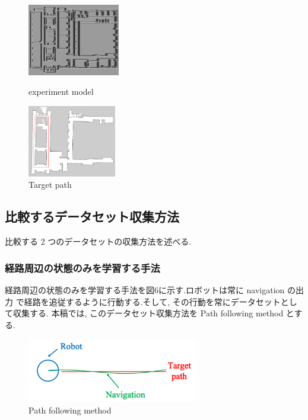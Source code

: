 \documentclass{jarticle}
\begin{document}
\begin{figure}[htbp]
  \begin{minipage}{0.5\hsize}
   \centering
   \includegraphics[width=40.1mm]{figs/gazebo.png}
   \caption{experiment model}
  \end{minipage}
  \begin{minipage}{0.5\hsize}
   \centering
   \includegraphics[width=38.5mm]{figs/rviz.png}
   \caption{Target path}
  \end{minipage}
 \end{figure}


\subsection{比較するデータセット収集方法}
比較する 2 つのデータセットの収集方法を述べる.\\

\subsubsection{経路周辺の状態のみを学習する手法}
経路周辺の状態のみを学習する手法を図6に示す.ロボットは常に navigation の出力
で経路を追従するように行動する.そして, その行動を常にデータセットとして収集する.
本稿では, このデータセット収集方法を Path following method とする.

\begin{figure}[h!]
  \centering
   \includegraphics[height=28mm]{./figs/dl.png}
   \caption{Path following method}
\end{figure}
\end{document}
